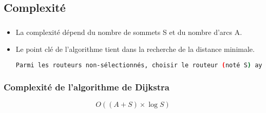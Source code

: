 \documentclass[svgnames,11pt]{beamer}
\begin{document}
\subsection{Complexité}
\begin{frame}[fragile]
    \frametitle{}

    \begin{itemize}
        \item<1->La complexité dépend du nombre de sommets S et du nombre d'arcs A.
        \item<2->Le point clé de l'algorithme tient dans la recherche de la distance minimale.
        \begin{center}
        \begin{lstlisting}[language=bash, basicstyle=\small, xleftmargin=0.5em, xrightmargin=0.5em]
Parmi les routeurs non-sélectionnés, choisir le routeur (noté S) ayant la plus petite distance.        
        \end{lstlisting}
        \end{center}
    \end{itemize}
\end{frame}

\begin{frame}
    \frametitle{Complexité de l'algorithme de Dijkstra}

    {\LARGE $$O((A+S)×\log{S})$$    }

\end{frame}
\end{document}

